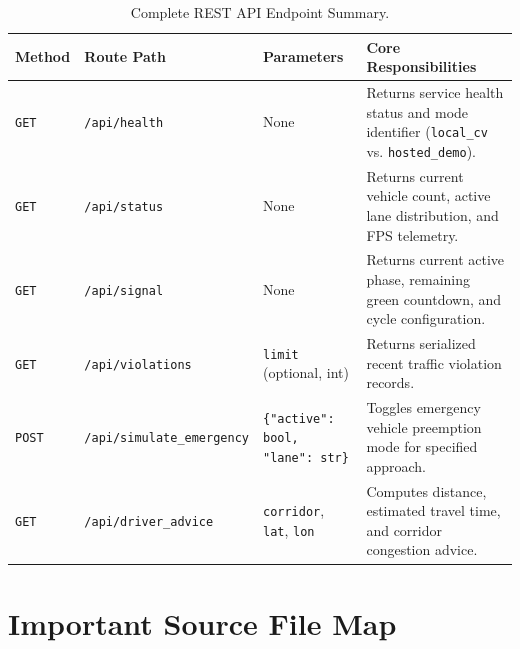 \documentclass[11pt,a4paper,oneside]{report}
\begin{document}
\begin{table}[H]
\centering
\small
\begin{tabularx}{\textwidth}{l l p{3.8cm} X}
\toprule
\textbf{Method} & \textbf{Route Path} & \textbf{Parameters} & \textbf{Core Responsibilities} \\
\midrule
\texttt{GET} & \texttt{/api/health} & None & Returns service health status and mode identifier (\texttt{local\_cv} vs. \texttt{hosted\_demo}). \\
\texttt{GET} & \texttt{/api/status} & None & Returns current vehicle count, active lane distribution, and FPS telemetry. \\
\texttt{GET} & \texttt{/api/signal} & None & Returns current active phase, remaining green countdown, and cycle configuration. \\
\texttt{GET} & \texttt{/api/violations} & \texttt{limit} (optional, int) & Returns serialized recent traffic violation records. \\
\texttt{POST} & \texttt{/api/simulate\_emergency} & \texttt{\{"active": bool, "lane": str\}} & Toggles emergency vehicle preemption mode for specified approach. \\
\texttt{GET} & \texttt{/api/driver\_advice} & \texttt{corridor}, \texttt{lat}, \texttt{lon} & Computes distance, estimated travel time, and corridor congestion advice. \\
\bottomrule
\end{tabularx}
\caption{Complete REST API Endpoint Summary.}
\label{tab:glossary_endpoints}
\end{table}

\section{Important Source File Map}
\label{sec:glossary_source_map}
\end{document}
